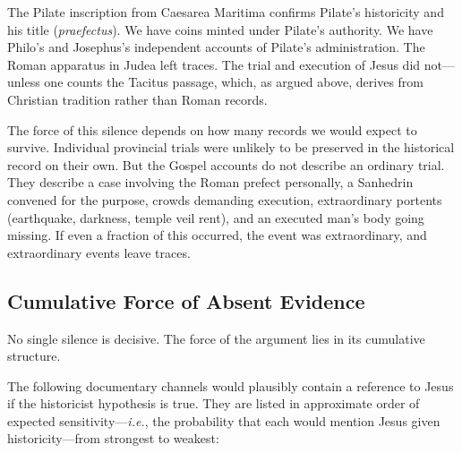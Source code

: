 \documentclass[12pt,oneside]{article}
\newcommand{\ie}{\textit{i.e.}}
\begin{document}
The Pilate inscription from Caesarea Maritima confirms Pilate's
historicity and his title (\textit{praefectus}).  We have coins minted
under Pilate's authority.  We have Philo's and Josephus's independent
accounts of Pilate's administration.  The Roman apparatus in Judea left
traces.  The trial and execution of Jesus did not---unless one counts
the Tacitus passage, which, as argued above, derives from Christian
tradition rather than Roman records.

The force of this silence depends on how many records we would expect
to survive.  Individual provincial trials were unlikely to be preserved
in the historical record on their own.  But the Gospel accounts do not
describe an ordinary trial.  They describe a case involving the Roman
prefect personally, a Sanhedrin convened for the purpose, crowds
demanding execution, extraordinary portents (earthquake, darkness,
temple veil rent), and an executed man's body going missing.  If even a
fraction of this occurred, the event was extraordinary, and extraordinary
events leave traces.

\subsection{Cumulative Force of Absent Evidence}
\label{sec:silence:cumulative}

No single silence is decisive.  The force of the argument lies in its
cumulative structure.

The following documentary channels would plausibly contain a reference
to Jesus if the historicist hypothesis is true.  They are listed in
approximate order of expected sensitivity---\ie, the probability that
each would mention Jesus given historicity---from strongest to weakest:
\end{document}
